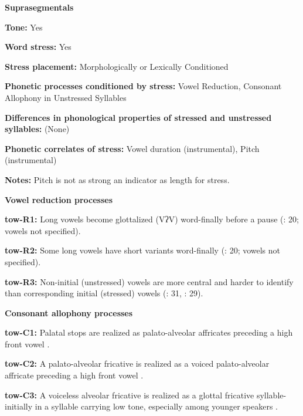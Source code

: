 \textbf{Suprasegmentals}



\textbf{Tone:} Yes



\textbf{Word stress:} Yes



\textbf{Stress placement:} Morphologically or Lexically Conditioned



\textbf{Phonetic processes conditioned by stress:} Vowel Reduction, Consonant Allophony in Unstressed Syllables



\textbf{Differences in phonological properties of stressed and unstressed syllables:} (None)



\textbf{Phonetic correlates of stress:} Vowel duration (instrumental), Pitch (instrumental)



\textbf{Notes:} Pitch is not as strong an indicator as length for stress.



\textbf{Vowel reduction processes}



\textbf{tow-R1:} Long vowels become glottalized (VʔV) word-finally before a pause (\citealt{Yumitani1998}: 20; vowels not specified).



\textbf{tow-R2:} Some long vowels have short variants word-finally (\citealt{Yumitani1998}: 20; vowels not specified).



\textbf{tow-R3:} Non-initial (unstressed) vowels are more central and harder to identify than corresponding initial (stressed) vowels (\citealt{Yumitani1998}: 31, \citealt{Bell1993}: 29).



\textbf{Consonant allophony processes}



\textbf{tow-C1:} Palatal stops are realized as palato-alveolar affricates preceding a high front vowel \citep[13]{Yumitani1998}.



\textbf{tow-C2:} A palato-alveolar fricative is realized as a voiced palato-alveolar affricate preceding a high front vowel \citep[13]{Yumitani1998}.



\textbf{tow-C3:} A voiceless alveolar fricative is realized as a glottal fricative syllable-initially in a syllable carrying low tone, especially among younger speakers \citep[13]{Yumitani1998}.



